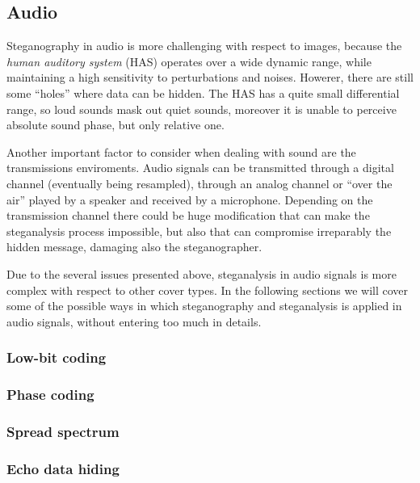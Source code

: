 \documentclass[../../main.tex]{subfiles}
\begin{document}
    \subsection{Audio}
    Steganography in audio is more challenging with respect to images, because
    the \emph{human auditory system} (HAS) operates over a wide dynamic range,
    while maintaining a high sensitivity to perturbations and noises.
    Howerer, there are still some ``holes'' where data can be hidden.
    The HAS has a quite small differential range, so loud sounds mask out quiet
    sounds, moreover it is unable to perceive absolute sound phase, but only
    relative one.

    Another important factor to consider when dealing with sound are the
    transmissions enviroments.
    Audio signals can be transmitted through a digital channel (eventually being
    resampled), through an analog channel or ``over the air'' played by a
    speaker and received by a microphone.
    Depending on the transmission channel there could be huge modification that
    can make the steganalysis process impossible, but also that can compromise
    irreparably the hidden message, damaging also the steganographer.

    Due to the several issues presented above, steganalysis in audio signals is
    more complex with respect to other cover types.
    In the following sections we will cover some of the possible ways in which
    steganography and steganalysis is applied in audio signals, without entering
    too much in details.

    
    \subsubsection{Low-bit coding}

    \subsubsection{Phase coding}

    \subsubsection{Spread spectrum}

    \subsubsection{Echo data hiding}
    
\end{document}
